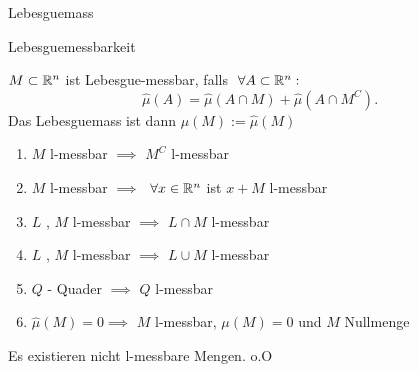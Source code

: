 \documentclass[class=article, crop=false]{standalone}
\begin{document}
\begin{zettel}{Lebesguemass}
\begin{flashcard}[46lf8shd]{Lebesguemessbarkeit}
	\begin{theorem}
		$M \subset  \mathbb{R}^n$ ist Lebesgue-messbar, falls $\forall A \subset \R^n:$
		\[
			\hat{\mu }(A)= \hat{\mu }(A \cap M) + \hat{\mu } (A \cap  M^C)
		.\]
		Das Lebesguemass ist dann $\mu(M) := \hat{\mu }(M)$
	\end{theorem}
\end{flashcard}

\begin{enumerate}
	\item $M$ l-messbar $\implies$  $M^C$ l-messbar
	\item $M$ l-messbar $\implies$  $\forall x \in  \R^n$ ist $x + M$ l-messbar
	\item $L$ , $M$ l-messbar $\implies$ $L \cap  M $ l-messbar
	\item $L$ , $M$ l-messbar $\implies$ $L \cup  M $ l-messbar
	\item $Q$ - Quader $\implies$ $Q$ l-messbar
	\item $\hat{\mu }(M) = 0 \implies $ $M$ l-messbar, $\mu(M) = 0$ und $M$ Nullmenge
\end{enumerate}

\begin{lemma}
	Es existieren nicht l-messbare Mengen. o.O
\end{lemma}

\end{zettel}
\end{document}
